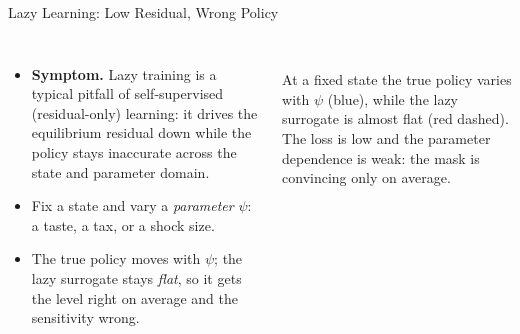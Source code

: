 \documentclass[aspectratio=169,11pt]{beamer}
\newcommand{\emphc}[1]{\textcolor{harvardcrimson}{#1}}
\newcommand{\param}{\theta}          %
\newcommand{\net}{\mathcal{N}_{\param}} %
\begin{document}
\begin{frame}{Lazy Learning: Low Residual, Wrong Policy}
\begin{columns}[T,onlytextwidth]
\begin{itemize}\setlength\itemsep{4pt}
  \item \textbf{\color{uzhblue}Symptom.} Lazy training is a typical pitfall of \emphc{self-supervised} (residual-only) learning: it drives the equilibrium residual down while the policy stays inaccurate across the state and parameter domain.
  \item Fix a state and vary a \emph{parameter} $\psi$: a taste, a tax, or a shock size.
  \item The true policy moves with $\psi$; the lazy surrogate stays \emph{flat}, so it gets the level right on average and the \emphc{sensitivity} wrong.
\end{itemize}
\centering
{}\\[2pt]
{\footnotesize At a fixed state the true policy varies with $\psi$ (blue), while the lazy surrogate is almost flat (red dashed). The loss is low and the parameter dependence is weak: the mask is convincing only on average.}
\end{columns}
\end{frame}
\end{document}
